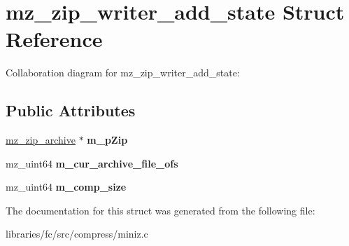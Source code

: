 \hypertarget{structmz__zip__writer__add__state}{}\section{mz\+\_\+zip\+\_\+writer\+\_\+add\+\_\+state Struct Reference}
\label{structmz__zip__writer__add__state}


Collaboration diagram for mz\+\_\+zip\+\_\+writer\+\_\+add\+\_\+state\+:
\subsection*{Public Attributes}
\begin{DoxyCompactItemize}
\item 
\mbox{\label{structmz__zip__writer__add__state_a8beb0e578862314a35cc724aeb95e709}} 
\mbox{\hyperlink{structmz__zip__archive__tag}{mz\+\_\+zip\+\_\+archive}} $\ast$ {\bfseries m\+\_\+p\+Zip}
\item 
\mbox{\label{structmz__zip__writer__add__state_a305f9fa7f47b583ee53b8ee0401edd9e}} 
mz\+\_\+uint64 {\bfseries m\+\_\+cur\+\_\+archive\+\_\+file\+\_\+ofs}
\item 
\mbox{\label{structmz__zip__writer__add__state_a4736843d8fbef3a1d323451bb29ae3cd}} 
mz\+\_\+uint64 {\bfseries m\+\_\+comp\+\_\+size}
\end{DoxyCompactItemize}


The documentation for this struct was generated from the following file\+:\begin{DoxyCompactItemize}
\item 
libraries/fc/src/compress/miniz.\+c\end{DoxyCompactItemize}
